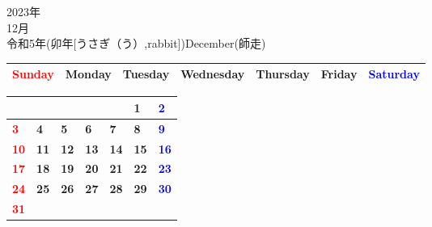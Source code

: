 \documentclass[a4paper,landscape]{jsarticle}
\newcommand{\dig}{\hspace{29mm}}
\newcommand{\tdig}{\hspace{27mm}}
\newcommand{\LBF}{\LARGE\textbf}
\begin{document}
\newpage

\begin{center}
	\HUGE 2023年\\
	\huge 12月\\
	\large 令和5年(卯年[うさぎ（う）,rabbit])December(師走)
\end{center}

\begingroup
\renewcommand{\arraystretch}{1.4}
\begin{tabular}{|>{\centering\arraybackslash}p{32mm}|>{\centering\arraybackslash}p{32mm}|>{\centering\arraybackslash}p{32mm}|>{\centering\arraybackslash}p{32mm}|>{\centering\arraybackslash}p{32mm}|>{\centering\arraybackslash}p{32mm}|>{\centering\arraybackslash}p{32mm}|}
\hline
\textcolor{red}{\large Sunday}&\large Monday&\large Tuesday&\large Wednesday&\large Thursday&\large Friday&\textcolor{blue}{\large Saturday}\\
\hline
\end{tabular}
\endgroup

\begingroup
\renewcommand{\arraystretch}{4}
\begin{tabular}{|p{32mm}|p{32mm}|p{32mm}|p{32mm}|p{32mm}|p{32mm}|p{32mm}|}
\hline
&&&&&\raisebox{30pt} {\dig\LBF{1}}&\raisebox{30pt} {\dig\textcolor{blue}{\LBF{2}}}\\
\hline
\raisebox{30pt} {\dig\textcolor{red}{\LBF{3}}}&\raisebox{30pt} {\dig\LBF{4}}&\raisebox{30pt} {\dig\LBF{5}}&\raisebox{30pt} {\dig\LBF{6}}&\raisebox{30pt} {\dig\LBF{7}}&\raisebox{30pt} {\dig\LBF{8}}&\raisebox{30pt} {\dig\textcolor{blue}{\LBF{9}}}\\
\hline
\raisebox{30pt} {\tdig\textcolor{red}{\LBF{10}}}&\raisebox{30pt} {\tdig\LBF{11}}&\raisebox{30pt} {\tdig\LBF{12}}&\raisebox{30pt} {\tdig\LBF{13}}&\raisebox{30pt} {\tdig\LBF{14}}&\raisebox{30pt} {\tdig\LBF{15}}&\raisebox{30pt} {\tdig\textcolor{blue}{\LBF{16}}}\\
\hline
\raisebox{30pt} {\tdig\textcolor{red}{\LBF{17}}}&\raisebox{30pt} {\tdig\LBF{18}}&\raisebox{30pt} {\tdig\LBF{19}}&\raisebox{30pt} {\tdig\LBF{20}}&\raisebox{30pt} {\tdig\LBF{21}}&\raisebox{30pt} {\tdig\LBF{22}}&\raisebox{30pt} {\tdig\textcolor{blue}{\LBF{23}}}\\
\hline
\raisebox{30pt} {\tdig\textcolor{red}{\LBF{24}}}&\raisebox{30pt} {\tdig\LBF{25}}&\raisebox{30pt} {\tdig\LBF{26}}&\raisebox{30pt} {\tdig\LBF{27}}&\raisebox{30pt} {\tdig\LBF{28}}&\raisebox{30pt} {\tdig\LBF{29}}&\raisebox{30pt} {\tdig\textcolor{blue}{\LBF{30}}}\\
\hline
\raisebox{30pt} {\tdig\textcolor{red}{\LBF{31}}}&&&&&&\\
\hline
\end{tabular}
\endgroup
\end{document}
